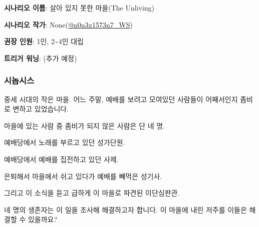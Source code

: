 \documentclass{report}
\begin{document}
	\textbf{시나리오 이름}: 살아 있지 못한 마을(The Unliving)
	
	\textbf{시나리오 작가}: None(\href{https://www.twitter.com/n0n3x1573n7_WS}{@n0n3x1573n7\_WS})
	
	\textbf{권장 인원}: 1인, 2\textasciitilde4인 대립
	
	\textbf{트리거 워닝}: (추가 예정)
	
	\subsubsection*{시놉시스}
	
	중세 시대의 작은 마을. 어느 주말, 예배를 보려고 모여있던 사람들이 어째서인지 좀비로 변하고 있었습니다.
	
	마을에 있는 사람 중 좀비가 되지 않은 사람은 단 네 명.
	
	예배당에서 노래를 부르고 있던 성가단원.
	
	예배당에서 예배를 집전하고 있던 사제.
	
	은퇴해서 마을에서 쉬고 있다가 예배를 빼먹은 성기사.
	
	그리고 이 소식을 듣고 급하게 이 마을로 파견된 이단심판관.
	
	네 명의 생존자는 이 일을 조사해 해결하고자 합니다. 이 마을에 내린 저주를 이들은 해결할 수 있을까요?
\end{document}
